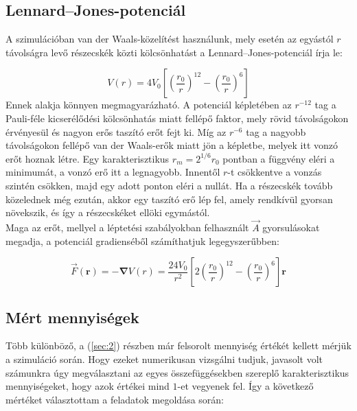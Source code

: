 \begin{multicols}{2}
\subsection{Lennard--Jones-potenciál} \label{sub:3.2}
A szimulációban van der Waals-közelítést használunk, mely esetén az egyástól $r$ távolságra levő részecskék közti kölcsönhatást a Lennard--Jones-potenciál\cite{1924RSPSA.106..463J} írja le:

\begin{equation}
    V \left( r \right)
    =
    4 V_{0} \left[ \left( \frac{r_{0}}{r} \right)^{12} - \left( \frac{r_{0}}{r} \right)^{6} \right]
\end{equation}
Ennek alakja könnyen megmagyarázható. A potenciál képletében az $r^{-12}$ tag a Pauli-féle kicserélődési kölcsönhatás miatt fellépő faktor, mely rövid távolságokon érvényesül és nagyon erős taszító erőt fejt ki. Míg az $r^{-6}$ tag a nagyobb távolságokon fellépő van der Waals-erők miatt jön a képletbe, melyek itt vonzó erőt hoznak létre. Egy karakterisztikus $r_{m} = 2^{1/6} r_{0}$ pontban a függvény eléri a minimumát, a vonzó erő itt a legnagyobb. Innentől $r$-t csökkentve a vonzás szintén csökken, majd egy adott ponton eléri a nullát. Ha a részecskék tovább közelednek még ezután, akkor egy taszító erő lép fel, amely rendkívül gyorsan növekszik, és így a részecskéket ellöki egymástól. \\
Maga az erőt, mellyel a léptetési szabályokban felhasznált $\vec{A}$ gyorsulásokat megadja, a potenciál gradienséből számíthatjuk legegyszerűbben:

\begin{equation}
    \vec{F} \left( \boldsymbol{r} \right)
    =
    - \boldsymbol{\nabla} V \left( r \right)
    =
    \frac{24 V_{0}}{r^{2}} \left[ 2 \left( \frac{r_{0}}{r} \right)^{12} - \left( \frac{r_{0}}{r} \right)^{6} \right] \boldsymbol{r}
\end{equation}

\subsection{Mért mennyiségek} \label{sub:3.3}
Több különböző, a (\ref{sec:2}) részben már felsorolt mennyiség értékét kellett mérjük a szimuláció során. Hogy ezeket numerikusan vizsgálni tudjuk, javasolt volt számunkra úgy megválasztani az egyes összefüggésekben szereplő karakterisztikus mennyiségeket, hogy azok értékei mind $1$-et vegyenek fel. Így a következő mértéket választottam a feladatok megoldása során:


\end{multicols}
